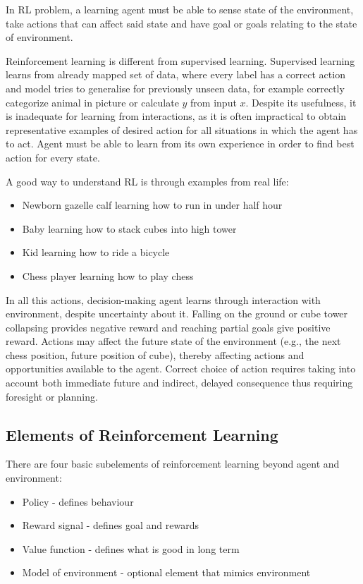 In RL problem, a learning agent must be able to sense state of the environment, take actions that can affect said state and have goal or goals relating to the state of environment.

Reinforcement learning is different from supervised learning. Supervised learning learns from already mapped set of data, where every label has a correct action and model tries to generalise for previously unseen data, for example correctly categorize animal in picture or calculate $y$ from input $x$. Despite its usefulness, it is inadequate for learning from interactions, as it is often impractical to obtain representative examples of desired action for all situations in which the agent has to act. Agent must be able to learn from its own experience in order to find best action for every state.\cite{RL}

A good way to understand RL is through examples from real life:
\begin{itemize}
  \item Newborn gazelle  calf learning how to run in under half hour
  \item Baby learning how to stack cubes into high tower
  \item Kid learning how to ride a bicycle
  \item Chess player learning how to play chess 
\end{itemize}

In all this actions, decision-making agent learns through interaction with environment, despite uncertainty about it. Falling on the ground or cube tower collapsing provides negative reward and reaching partial goals give positive reward. Actions may affect the future state of the environment (e.g., the next chess position, future position of cube), thereby affecting actions and opportunities available to the agent. Correct choice of action requires taking into account both immediate future and indirect, delayed consequence thus requiring foresight or planning.\cite{RL}

\subsection{Elements of Reinforcement Learning}
There are four basic subelements of reinforcement learning beyond agent and environment:
\begin{itemize}
  \item Policy - defines behaviour
  \item Reward signal - defines goal and rewards
  \item Value function - defines what is good in long term
  \item Model of environment - optional element that mimics environment
\end{itemize}

